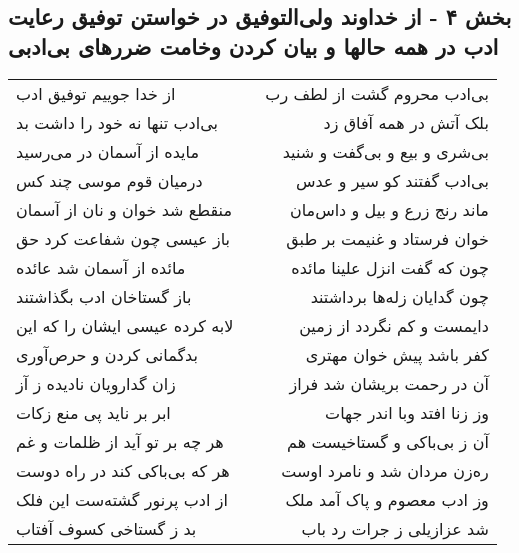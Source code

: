 \begin{center}
\section*{بخش ۴ - از خداوند ولی‌التوفیق در خواستن توفیق رعایت ادب در همه حالها و بیان کردن وخامت ضررهای بی‌ادبی}
\label{sec:sh004}
\begin{longtable}{l p{0.5cm} r}
از خدا جوییم توفیق ادب
&&
بی‌ادب محروم گشت از لطف رب
\\
بی‌ادب تنها نه خود را داشت بد
&&
بلک آتش در همه آفاق زد
\\
مایده از آسمان در می‌رسید
&&
بی‌شری و بیع و بی‌گفت و شنید
\\
درمیان قوم موسی چند کس
&&
بی‌ادب گفتند کو سیر و عدس
\\
منقطع شد خوان و نان از آسمان
&&
ماند رنج زرع و بیل و داس‌مان
\\
باز عیسی چون شفاعت کرد حق
&&
خوان فرستاد و غنیمت بر طبق
\\
مائده از آسمان شد عائده
&&
 چون که گفت انزل علینا مائده
\\
باز گستاخان ادب بگذاشتند
&&
چون گدایان زله‌ها برداشتند
\\
لابه کرده عیسی ایشان را که این
&&
دایمست و کم نگردد از زمین
\\
بدگمانی کردن و حرص‌آوری
&&
کفر باشد پیش خوان مهتری
\\
زان گدارویان نادیده ز آز
&&
آن در رحمت بریشان شد فراز
\\
ابر بر ناید پی منع زکات
&&
وز زنا افتد وبا اندر جهات
\\
هر چه بر تو آید از ظلمات و غم
&&
آن ز بی‌باکی و گستاخیست هم
\\
هر که بی‌باکی کند در راه دوست
&&
ره‌زن مردان شد و نامرد اوست
\\
از ادب پرنور گشته‌ست این فلک
&&
وز ادب معصوم و پاک آمد ملک
\\
بد ز گستاخی کسوف آفتاب
&&
شد عزازیلی ز جرات رد باب
\\
\end{longtable}
\end{center}
